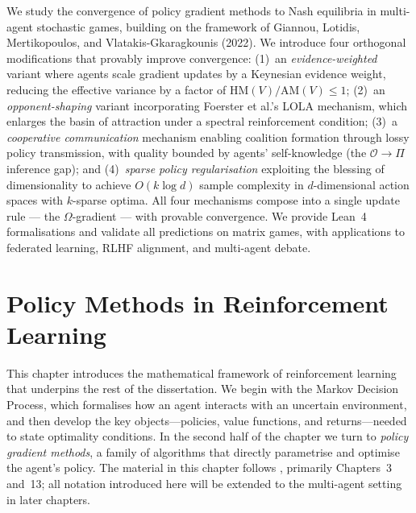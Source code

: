 \documentclass[a4paper,oneside,11pt]{report}
\begin{document}

\dissertationtitlepage


\begin{dissertationsummary}
We study the convergence of policy gradient methods to Nash equilibria in multi-agent stochastic games, building on the framework of Giannou, Lotidis, Mertikopoulos, and Vlatakis-Gkaragkounis (2022). We introduce four orthogonal modifications that provably improve convergence: (1)~an \emph{evidence-weighted} variant where agents scale gradient updates by a Keynesian evidence weight, reducing the effective variance by a factor of $\mathrm{HM}(V)/\mathrm{AM}(V) \leq 1$; (2)~an \emph{opponent-shaping} variant incorporating Foerster et al.'s LOLA mechanism, which enlarges the basin of attraction under a spectral reinforcement condition; (3)~a \emph{cooperative communication} mechanism enabling coalition formation through lossy policy transmission, with quality bounded by agents' self-knowledge (the $\mathcal{O} \to \Pi$ inference gap); and (4)~\emph{sparse policy regularisation} exploiting the blessing of dimensionality to achieve $O(k \log d)$ sample complexity in $d$-dimensional action spaces with $k$-sparse optima. All four mechanisms compose into a single update rule --- the $\Omega$-gradient --- with provable convergence. We provide Lean~4 formalisations and validate all predictions on matrix games, with applications to federated learning, RLHF alignment, and multi-agent debate.
\end{dissertationsummary}


\dissertationtableofcontents






\chapter{Policy Methods in Reinforcement Learning}
\label{ch:policy-methods}

This chapter introduces the mathematical framework of reinforcement learning that underpins the rest of the dissertation. We begin with the Markov Decision Process, which formalises how an agent interacts with an uncertain environment, and then develop the key objects---policies, value functions, and returns---needed to state optimality conditions. In the second half of the chapter we turn to \emph{policy gradient methods}, a family of algorithms that directly parametrise and optimise the agent's policy. The material in this chapter follows \cite{sutton2018rl}, primarily Chapters~3 and~13; all notation introduced here will be extended to the multi-agent setting in later chapters.
\end{document}
